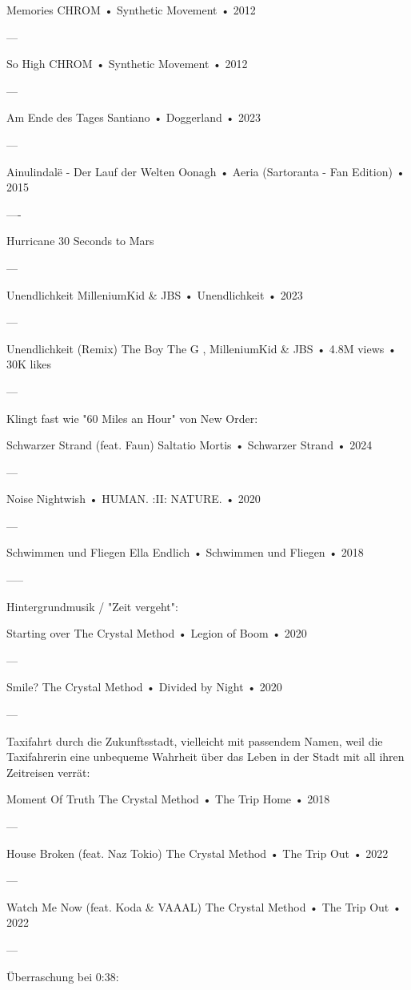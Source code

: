 Memories
CHROM
 •
Synthetic Movement
 •
2012

—

So High
CHROM
 •
Synthetic Movement
 •
2012

—

Am Ende des Tages
Santiano
 •
Doggerland
 • 2023

—

Ainulindalë - Der Lauf der Welten
Oonagh
 •
Aeria (Sartoranta - Fan Edition)
 • 2015


—-

Hurricane
30 Seconds to Mars


—

Unendlichkeit
MilleniumKid
 &
JBS
 •
Unendlichkeit
 •
2023

—

Unendlichkeit (Remix)
The Boy The G
,
MilleniumKid
 &
JBS
 •
4.8M views
 •
30K likes

—

Klingt fast wie "60 Miles an Hour" von New Order:

Schwarzer Strand (feat. Faun)
Saltatio Mortis
 •
Schwarzer Strand
 •
2024

—

Noise
Nightwish
 •
HUMAN. :II: NATURE.
 •
2020

—

Schwimmen und Fliegen
Ella Endlich
 •
Schwimmen und Fliegen
 •
2018

—--

Hintergrundmusik / "Zeit vergeht":

Starting over
The Crystal Method
 •
Legion of Boom
 •
2020

—

Smile?
The Crystal Method
 •
Divided by Night
 •
2020

—

Taxifahrt durch die Zukunftsstadt, vielleicht mit passendem Namen, weil die Taxifahrerin eine unbequeme Wahrheit über das Leben in der Stadt mit all ihren Zeitreisen verrät:

Moment Of Truth
The Crystal Method
 •
The Trip Home
 •
2018

—

House Broken (feat. Naz Tokio)
The Crystal Method
 •
The Trip Out
 •
2022

—

Watch Me Now (feat. Koda & VAAAL)
The Crystal Method
 •
The Trip Out
 •
2022

—

Überraschung bei 0:38:

